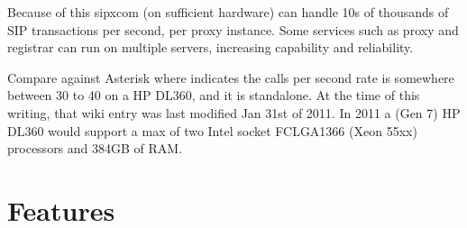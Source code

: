 \documentclass[letterpaper,10pt,english]{sphinxmanual}
\begin{document}
Because of this sipxcom (on sufficient hardware) can handle 10s of thousands of SIP transactions per second, per proxy instance. Some services such as proxy and registrar can run on multiple servers, increasing capability and reliability.

Compare against Asterisk where  indicates the calls per second rate is somewhere between 30 to 40 on a HP DL360, and it is standalone.
At the time of this writing, that wiki entry was last modified Jan 31st of 2011. In 2011 a (Gen 7) HP DL360 would support a max of two Intel socket FCLGA1366 (Xeon 55xx) processors and 384GB of RAM.

\ignorespaces 

\chapter{Features}
\label{\detokenize{features:features}}\label{\detokenize{features:index-0}}\label{\detokenize{features::doc}}
\end{document}
